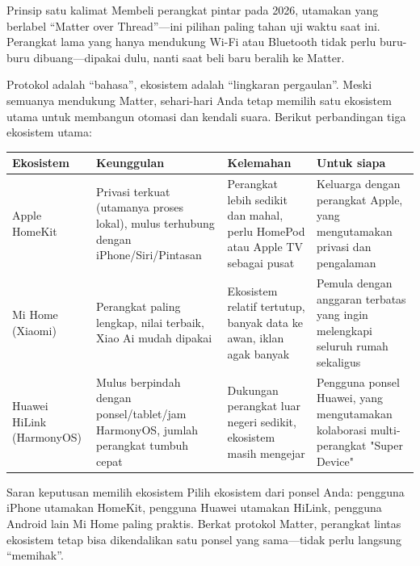 \begin{tcbinfo}{Prinsip satu kalimat}
Membeli perangkat pintar pada 2026, utamakan yang berlabel “Matter over Thread”—ini pilihan paling tahan uji waktu saat ini. Perangkat lama yang hanya mendukung Wi-Fi atau Bluetooth tidak perlu buru-buru dibuang—dipakai dulu, nanti saat beli baru beralih ke Matter.

\end{tcbinfo}


Protokol adalah “bahasa”, ekosistem adalah “lingkaran pergaulan”. Meski semuanya mendukung Matter, sehari-hari Anda tetap memilih satu ekosistem utama untuk membangun otomasi dan kendali suara. Berikut perbandingan tiga ekosistem utama:

\begin{center}
\begin{tabularx}{\linewidth}{|X|X|X|X|}
\hline
\textbf{Ekosistem} & \textbf{Keunggulan} & \textbf{Kelemahan} & \textbf{Untuk siapa} \tabularnewline
\hline
Apple HomeKit & Privasi terkuat (utamanya proses lokal), mulus terhubung dengan iPhone/Siri/Pintasan & Perangkat lebih sedikit dan mahal, perlu HomePod atau Apple TV sebagai pusat & Keluarga dengan perangkat Apple, yang mengutamakan privasi dan pengalaman \tabularnewline
Mi Home (Xiaomi) & Perangkat paling lengkap, nilai terbaik, Xiao Ai mudah dipakai & Ekosistem relatif tertutup, banyak data ke awan, iklan agak banyak & Pemula dengan anggaran terbatas yang ingin melengkapi seluruh rumah sekaligus \tabularnewline
Huawei HiLink (HarmonyOS) & Mulus berpindah dengan ponsel/tablet/jam HarmonyOS, jumlah perangkat tumbuh cepat & Dukungan perangkat luar negeri sedikit, ekosistem masih mengejar & Pengguna ponsel Huawei, yang mengutamakan kolaborasi multi-perangkat "Super Device" \tabularnewline
\hline
\end{tabularx}
\end{center}

\begin{tcbinfo}{Saran keputusan memilih ekosistem}
Pilih ekosistem dari ponsel Anda: pengguna iPhone utamakan HomeKit, pengguna Huawei utamakan HiLink, pengguna Android lain Mi Home paling praktis. Berkat protokol Matter, perangkat lintas ekosistem tetap bisa dikendalikan satu ponsel yang sama—tidak perlu langsung “memihak”.

\end{tcbinfo}


